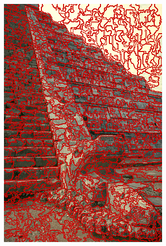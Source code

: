 \begin{figure}
{		\includegraphics[scale=\scalefivebsdtest]{pictures/bsd-test-6-reseedsmp}
	}
	\subfigure{
}
\end{figure}
